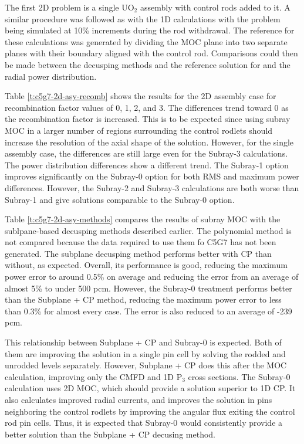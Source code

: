 The first 2D problem is a single UO$_2$ assembly with control rods added to it.  A similar procedure was followed as with the 1D calculations with the problem being simulated at 10\% increments during the rod withdrawal.  The reference for these calculations was generated by dividing the MOC plane into two separate planes with their boundary aligned with the control rod.  Comparisons could then be made between the decusping methods and the reference solution for \keff{} and the radial power distribution.

Table \ref{t:c5g7-2d-asy-recomb} shows the results for the 2D assembly case for recombination factor values of 0, 1, 2, and 3.  The \keff{} differences trend toward 0 as the recombination factor is increased.  This is to be expected since using subray MOC in a larger number of regions surrounding the control rodlets should increase the resolution of the axial shape of the solution.  However, for the single assembly case, the \keff{} differences are still large even for the Subray-3 calculations.  The power distribution differences show a different trend.  The Subray-1 option improves significantly on the Subray-0 option for both RMS and maximum power differences.  However, the Subray-2 and Subray-3 calculations are both worse than Subray-1 and give solutions comparable to the Subray-0 option.

Table \ref{t:c5g7-2d-asy-methods} compares the results of subray MOC with the sublpane-based decusping methods described earlier.  The polynomial method is not compared because the data required to use them fo C5G7 has not been generated.  The subplane decusping method performs better with CP than without, as expected.  Overall, its performance is good, reducing the maximum power error to around 0.5\% on average and reducing the \keff{} error from an average of almost 5\% to under 500 pcm.  However, the Subray-0 treatment performs better than the Subplane + CP method, reducing the maximum power error to less than 0.3\% for almost every case.  The \keff{} error is also reduced to an average of -239 pcm.

This relationship between Subplane + CP and Subray-0 is expected.  Both of them are improving the solution in a single pin cell by solving the rodded and unrodded levels separately.  However, Subplane + CP does this after the MOC calculation, improving only the CMFD and 1D P$_3$ cross sections.  The Subray-0 calculation uses 2D MOC, which should provide a solution superior to 1D CP.  It also calculates improved radial currents, and improves the solution in pins neighboring the control rodlets by improving the angular flux exiting the control rod pin cells.  Thus, it is expected that Subray-0 would consistently provide a better solution than the Subplane + CP decusing method.

